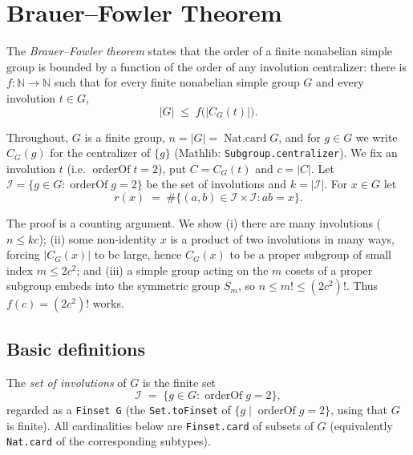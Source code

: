 


\section{Brauer--Fowler Theorem}

The \emph{Brauer--Fowler theorem} states that the order of a finite nonabelian
simple group is bounded by a function of the order of any involution
centralizer: there is $f : \mathbb{N} \to \mathbb{N}$ such that for every finite
nonabelian simple group $G$ and every involution $t \in G$,
\[
    |G| \;\le\; f\bigl(|C_G(t)|\bigr).
\]

Throughout, $G$ is a finite group, $n = |G| = \operatorname{Nat.card} G$, and for
$g \in G$ we write $C_G(g)$ for the centralizer of $\{g\}$
(Mathlib: \texttt{Subgroup.centralizer}). We fix an involution $t$ (i.e.
$\operatorname{orderOf} t = 2$), put $C = C_G(t)$ and $c = |C|$. Let
$\mathcal{I} = \{g \in G : \operatorname{orderOf} g = 2\}$ be the set of
involutions and $k = |\mathcal{I}|$. For $x \in G$ let
\[
    r(x) \;=\; \#\{(a,b) \in \mathcal{I} \times \mathcal{I} : ab = x\}.
\]

The proof is a counting argument. We show (i) there are many involutions
($n \le kc$); (ii) some non-identity $x$ is a product of two involutions in many
ways, forcing $|C_G(x)|$ to be large, hence $C_G(x)$ to be a proper subgroup of
small index $m \le 2c^2$; and (iii) a simple group acting on the $m$ cosets of a
proper subgroup embeds into the symmetric group $S_m$, so $n \le m! \le (2c^2)!$.
Thus $f(c) = (2c^2)!$ works.

\subsection{Basic definitions}

\begin{definition}
    \label{def:involution-set}
    \leanok
    The \emph{set of involutions} of $G$ is the finite set
    \[
        \mathcal{I} \;=\; \{g \in G : \operatorname{orderOf} g = 2\},
    \]
    regarded as a \texttt{Finset G} (the \texttt{Set.toFinset} of
    $\{g \mid \operatorname{orderOf} g = 2\}$, using that $G$ is finite). All
    cardinalities below are \texttt{Finset.card} of subsets of $G$ (equivalently
    \texttt{Nat.card} of the corresponding subtypes).
\end{definition}

